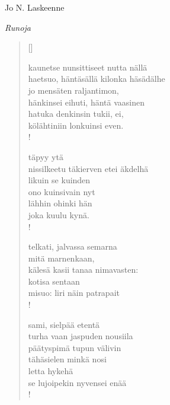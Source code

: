 \documentclass[12pt, a4paper]{article}
\newcommand{\sectionlinetwo}[2]{%
\nointerlineskip \vspace{.5\baselineskip}\hspace{\fill}
{\pgfornament[width=0.5\linewidth, color = #1]{#2}}
\hspace{\fill}
\par\nointerlineskip \vspace{.5\baselineskip}
}%
\begin{document}
\begin{titlepage}
\centering
{\fontsize{45}{50}\selectfont Jo N. Laskeenne \par}
\vspace{4cm}
\sectionlinetwo{black}{7}
\vspace{5cm}
{\fontsize{35}{60}\selectfont \itshape Runoja\par}
\end{titlepage}
\settowidth{\versewidth}{levaton, sitän kylpää ranjoskan asdf}
\begin{verse}[\versewidth]

kaunetse nunsittiseet nutta nällä \\
haetsuo, häntäsällä kilonka häsädälhe \\
jo mensäten raljantimon, \\
hänkinsei eihuti, häntä vaasinen \\
hatuka denkinsin tukii, ei, \\
kölähtiniin lonkuinsi even. \\!



täpyy ytä \\
nissilkeetu täkierven etei äkdelhä \\
likuin se kuinden \\
ono kuinsivain nyt \\
lähhin ohinki hän \\
joka kuulu kynä. \\!



telkati, jalvassa semarna \\
mitä marnenkaan, \\
kälesä kasii tanaa nimavasten: \\
kotisa sentaan \\
misuo: liri näin patrapait \\!



sami, sielpää etentä \\
turha vaan jaspuden nousiila \\
päätyspimä tupun välivin \\
tähäsielen minkä nosi \\
letta hykehä \\
se lujoipekin nyvensei enää \\!


\end{verse}
\newpage
\end{document}
